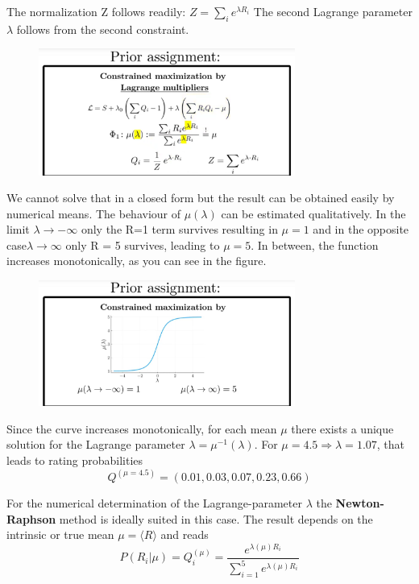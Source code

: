 \documentclass[12pt, a4paper]{scrartcl}
\begin{document}
The normalization Z follows readily: $Z=\sum_ie^{\lambda R_i}$
The second Lagrange parameter $\lambda$ follows from the second constraint.
 \begin{figure}[H]
	\centering
	\includegraphics[width=0.75\textwidth]{6_7.png}
\end{figure}
We cannot solve that in a closed form but the result can be obtained easily
by numerical means.
The behaviour of $\mu(\lambda)$ can be estimated qualitatively. In the limit $\lambda\rightarrow -\infty$
only the R=1 term survives resulting in $\mu = 1$ and in the opposite
case$\lambda \rightarrow \infty$ only R = 5 survives, leading to $\mu=5$. In between, the
function increases monotonically, as you can see in the ﬁgure. %
 \begin{figure}[H]
	\centering
	\includegraphics[width=0.75\textwidth]{6_8.png}
\end{figure}
Since the curve
increases monotonically, for each mean $\mu$ there exists a unique solution for
the Lagrange parameter $\lambda=\mu^{-1}(\lambda)$. For $\mu =4.5 \Rightarrow \lambda=1.07$, that leads to rating probabilities \[Q^{(\mu=4.5)}=(0.01,0.03,0.07,0.23,0.66)\]

For the numerical determination of the Lagrange-parameter $\lambda$
the \textbf{Newton-Raphson} method is ideally suited in this case. The result depends on the
intrinsic or true mean $\mu=\langle R\rangle$ and reads\\%

\begin{equation*}\boxed{P(R_i|\mu)=Q_i^{(\mu)}=\frac{e^{\lambda(\mu)R_i}}{\sum_{i=1}^5e^{\lambda(\mu)R_i}}
}\end{equation*}\\
\end{document}
